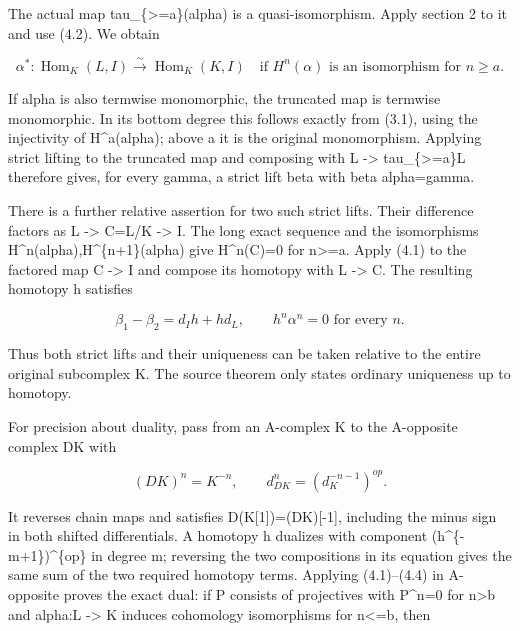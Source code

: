 \documentclass[11pt]{article}
\begin{document}
The actual map tau\_\allowbreak{}\{>\allowbreak{}=a\}(alpha)\allowbreak{} is a quasi-isomorphism. Apply section 2 to it and use (4.2)\allowbreak{}. We obtain

\[
 \alpha^*:\operatorname{Hom}_K(L,I)
             \xrightarrow{\sim}\operatorname{Hom}_K(K,I)
 \quad\text{if }H^n(\alpha)\text{ is an isomorphism for }n\ge a.
                                                               \tag{4.3}
\]

If alpha is also termwise monomorphic,\allowbreak{} the truncated map is termwise monomorphic. In its bottom degree this follows exactly from (3.1)\allowbreak{},\allowbreak{} using the injectivity of H\textasciicircum{}a(alpha)\allowbreak{}; above a it is the original monomorphism. Applying strict lifting to the truncated map and composing with L \allowbreak{}-> tau\_\allowbreak{}\{>\allowbreak{}=a\}L therefore gives,\allowbreak{} for every gamma,\allowbreak{} a strict lift beta with beta alpha\allowbreak{}=gamma.

There is a further relative assertion for two such strict lifts. Their difference factors as L \allowbreak{}-> C\allowbreak{}=L/\allowbreak{}K \allowbreak{}-> I. The long exact sequence and the isomorphisms H\textasciicircum{}n(alpha)\allowbreak{},\allowbreak{}H\textasciicircum{}\{n\allowbreak{}+1\}(alpha)\allowbreak{} give H\textasciicircum{}n(C)\allowbreak{}\allowbreak{}=0 for n>\allowbreak{}=a. Apply (4.1)\allowbreak{} to the factored map C \allowbreak{}-> I and compose its homotopy with L \allowbreak{}-> C. The resulting homotopy h satisfies

\[
 \beta_1-\beta_2=d_Ih+h d_L,\qquad h^n\alpha^n=0
                                                    \text{ for every }n. \tag{4.4}
\]

Thus both strict lifts and their uniqueness can be taken relative to the entire original subcomplex K. The source theorem only states ordinary uniqueness up to homotopy.

For precision about duality,\allowbreak{} pass from an A-complex K to the A-opposite complex DK with

\[
 (DK)^n=K^{-n},\qquad d_{DK}^n=(d_K^{-n-1})^{op}.
\]

It reverses chain maps and satisfies D(K[1]\allowbreak{})\allowbreak{}\allowbreak{}=(DK)\allowbreak{}[-1]\allowbreak{},\allowbreak{} including the minus sign in both shifted differentials. A homotopy h dualizes with component (h\textasciicircum{}\{-m\allowbreak{}+1\})\allowbreak{}\textasciicircum{}\{op\} in degree m; reversing the two compositions in its equation gives the same sum of the two required homotopy terms. Applying (4.1)\allowbreak{}–\allowbreak{}(4.4)\allowbreak{} in A-opposite proves the exact dual:\allowbreak{} if P consists of projectives with P\textasciicircum{}n\allowbreak{}=0 for n\textgreater b and alpha:\allowbreak{}L \allowbreak{}-> K induces cohomology isomorphisms for n<\allowbreak{}=b,\allowbreak{} then
\end{document}
